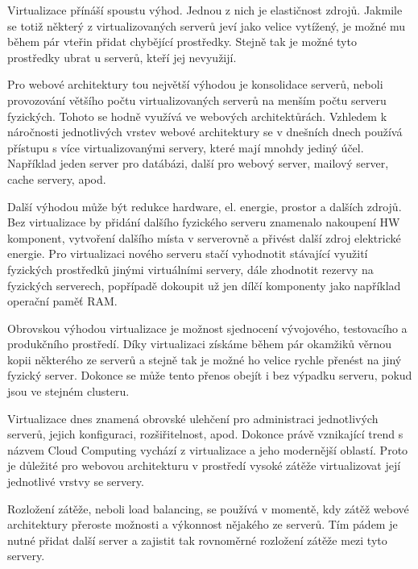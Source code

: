 \documentclass[12pt]{article}
\begin{document}
Virtualizace přínáší spoustu výhod. Jednou z nich je elastičnost zdrojů. Jakmile se totiž některý z virtualizovaných serverů jeví jako velice vytížený, je možné mu během pár vteřin přidat chybějící prostředky. Stejně tak je možné tyto prostředky ubrat u serverů, kteří jej nevyužijí.

Pro webové architektury tou největší výhodou je konsolidace serverů, neboli provozování většího počtu virtualizovaných serverů na menším počtu serveru fyzických. Tohoto se hodně využívá ve webových architektůrách. Vzhledem k náročnosti jednotlivých vrstev webové architektury se v dnešních dnech používá přístupu s více virtualizovanými servery, které mají mnohdy jediný účel. Například jeden server pro datábázi, další pro webový server, mailový server, cache servery, apod.

Další výhodou může být redukce hardware, el. energie, prostor a dalších zdrojů. Bez virtualizace by přidání dalšího fyzického serveru znamenalo nakoupení HW komponent, vytvoření dalšího místa v serverovně a přivést další zdroj elektrické energie. Pro virtualizaci nového serveru stačí vyhodnotit stávající využití fyzických prostředků jinými virtuálními servery, dále zhodnotit rezervy na fyzických serverech, popřípadě dokoupit už jen dílčí komponenty jako například operační paměť RAM.

Obrovskou výhodou virtualizace je možnost sjednocení vývojového, testovacího a produkčního prostředí. Díky virtualizaci získáme během pár okamžiků věrnou kopii některého ze serverů a stejně tak je možné ho velice rychle přenést na jiný fyzický server. Dokonce se může tento přenos obejít i bez výpadku serveru, pokud jsou ve stejném clusteru.

Virtualizace dnes znamená obrovské ulehčení pro administraci jednotlivých serverů, jejich konfiguraci, rozšiřitelnost, apod. Dokonce právě vznikající trend s názvem Cloud Computing vychází z virtualizace a jeho modernější oblastí. Proto je důležité pro webovou architekturu v prostředí vysoké zátěže virtualizovat její jednotlivé vrstvy se servery.\cite{virtual}

\clearpage

\obrazek
{}


Rozložení zátěže, neboli load balancing, se používá v momentě, kdy zátěž webové architektury přeroste možnosti a výkonnost nějakého ze serverů. Tím pádem je nutné přidat další server a zajistit tak rovnoměrné rozložení zátěže mezi tyto servery. 
\end{document}
